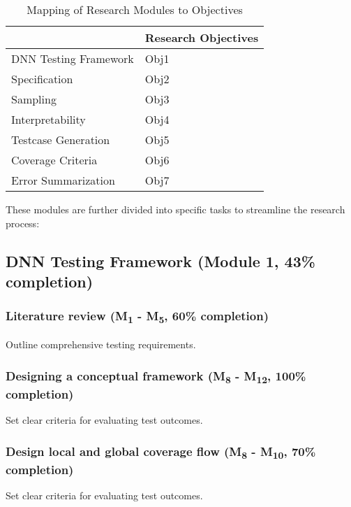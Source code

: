 \begin{table}[ht]
  \centering
  \renewcommand{\arraystretch}{1.5} %
  \begin{tabular}{|l|l|}
    \hline
    \rowcolor[HTML]{000000} 
    \multicolumn{1}{|c|}{\cellcolor[HTML]{000000}{\color[HTML]{FFFFFF} \textbf{Research Modules}}} & {\color[HTML]{FFFFFF} \textbf{Research Objectives}} \\ \hline
    {\color[HTML]{404040} DNN Testing Framework} & Obj1 \\ \hline
    {\color[HTML]{404040} Specification} & Obj2 \\ \hline
    {\color[HTML]{404040} Sampling} & Obj3 \\ \hline
    {\color[HTML]{404040} Interpretability} & Obj4 \\ \hline
    {\color[HTML]{404040} Testcase Generation} & Obj5 \\ \hline
    {\color[HTML]{404040} Coverage Criteria} & Obj6 \\ \hline
    Error Summarization & Obj7 \\ \hline
  \end{tabular}
  \caption{Mapping of Research Modules to Objectives}
  \label{table:modules}
\end{table}

These modules are further divided into specific tasks to streamline the research process:

\subsection{DNN Testing Framework (Module 1, 43\% completion)}
\subsubsection{Literature review (M\textsubscript{1} - M\textsubscript{5}, 60\% completion)}
Outline comprehensive testing requirements.

\subsubsection{Designing a conceptual framework (M\textsubscript{8} - M\textsubscript{12}, 100\% completion)}
Set clear criteria for evaluating test outcomes.

\subsubsection{Design local and global coverage flow (M\textsubscript{8} - M\textsubscript{10}, 70\% completion)}
Set clear criteria for evaluating test outcomes.

